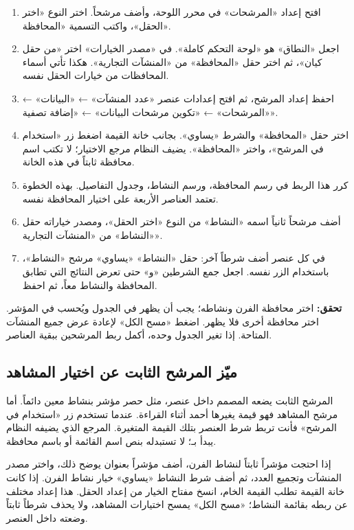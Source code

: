 \begin{enumerate}
\item افتح إعداد «المرشحات» في محرر اللوحة، وأضف مرشحاً. اختر النوع «اختر الحقل»، واكتب التسمية «المحافظة».
\item اجعل «النطاق» هو «لوحة التحكم كاملة». في «مصدر الخيارات» اختر «من حقل كيان»، ثم اختر حقل «المحافظة» من «المنشآت التجارية». هكذا تأتي أسماء المحافظات من خيارات الحقل نفسه.
\item احفظ إعداد المرشح، ثم افتح إعدادات عنصر «عدد المنشآت» ← «البيانات» ← «المرشحات» ← «تكوين مرشحات البيانات» ← «إضافة تصفية».
\item اختر حقل «المحافظة» والشرط «يساوي». بجانب خانة القيمة اضغط زر «استخدام في المرشح»، واختر «المحافظة». يضيف النظام مرجع الاختيار؛ لا تكتب اسم محافظة ثابتاً في هذه الخانة.
\item كرر هذا الربط في رسم المحافظة، ورسم النشاط، وجدول التفاصيل. بهذه الخطوة تعتمد العناصر الأربعة على اختيار المحافظة نفسه.
\item أضف مرشحاً ثانياً اسمه «النشاط» من النوع «اختر الحقل»، ومصدر خياراته حقل «النشاط» من «المنشآت التجارية».
\item في كل عنصر أضف شرطاً آخر: حقل «النشاط» «يساوي» مرشح «النشاط»، باستخدام الزر نفسه. اجعل جمع الشرطين «و» حتى تعرض النتائج التي تطابق المحافظة والنشاط معاً، ثم احفظ.
\end{enumerate}

\textbf{تحقق:} اختر محافظة الفرن ونشاطه؛ يجب أن يظهر في الجدول ويُحسب في المؤشر. اختر محافظة أخرى فلا يظهر. اضغط «مسح الكل» لإعادة عرض جميع المنشآت المتاحة. إذا تغير الجدول وحده، أكمل ربط المرشحين ببقية العناصر.

\subsection{ميّز المرشح الثابت عن اختيار المشاهد}

المرشح الثابت يضعه المصمم داخل عنصر، مثل حصر مؤشر بنشاط معين دائماً. أما مرشح المشاهد فهو قيمة يغيرها أحمد أثناء القراءة. عندما تستخدم زر «استخدام في المرشح» فأنت تربط شرط العنصر بتلك القيمة المتغيرة. المرجع الذي يضيفه النظام يبدأ بـ؛ لا تستبدله بنص اسم القائمة أو باسم محافظة.

إذا احتجت مؤشراً ثابتاً لنشاط الفرن، أضف مؤشراً بعنوان يوضح ذلك، واختر مصدر المنشآت وتجميع العدد، ثم أضف شرط النشاط «يساوي» خيار نشاط الفرن. إذا كانت خانة القيمة تطلب القيمة الخام، انسخ مفتاح الخيار من إعداد الحقل. هذا إعداد مختلف عن ربطه بقائمة النشاط؛ «مسح الكل» يمسح اختيارات المشاهد، ولا يحذف شرطاً ثابتاً وضعته داخل العنصر.


